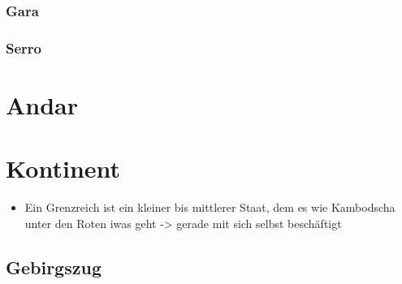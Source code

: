 \subsubsection{Gara} \label{sec:planet-zwilling}

\subsubsection{Serro} \label{sec:mond}

\section{Andar} \label{sec:planet}
\section{Kontinent}
\begin{itemize}
	\item Ein Grenzreich ist ein kleiner bis mittlerer Staat, dem es wie Kambodscha unter den Roten iwas geht -> gerade mit sich selbst beschäftigt
\end{itemize}

\subsection{Gebirgszug}
